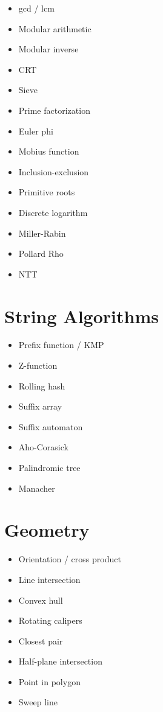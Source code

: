 \begin{itemize}
  \item gcd / lcm
  \item Modular arithmetic
  \item Modular inverse
  \item CRT
  \item Sieve
  \item Prime factorization
  \item Euler phi
  \item Mobius function
  \item Inclusion-exclusion
  \item Primitive roots
  \item Discrete logarithm
  \item Miller-Rabin
  \item Pollard Rho
  \item NTT
\end{itemize}

\section*{String Algorithms}

\begin{itemize}
  \item Prefix function / KMP
  \item Z-function
  \item Rolling hash
  \item Suffix array
  \item Suffix automaton
  \item Aho-Corasick
  \item Palindromic tree
  \item Manacher
\end{itemize}

\section*{Geometry}

\begin{itemize}
  \item Orientation / cross product
  \item Line intersection
  \item Convex hull
  \item Rotating calipers
  \item Closest pair
  \item Half-plane intersection
  \item Point in polygon
  \item Sweep line
\end{itemize}

